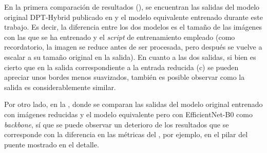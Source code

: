 %
%
%
%    





En la primera comparación de resultados (), se encuentran las salidas del modelo original DPT-Hybrid publicado en \cite{visiontransformersDPT} y el modelo equivalente entrenado durante este trabajo. Es decir, la diferencia entre los dos modelos es el tamaño de las imágenes con las que se ha entrenado y el \textit{script} de entrenamiento empleado (como recordatorio, la imagen se reduce antes de ser procesada, pero después se vuelve a escalar a su tamaño original en la salida). En cuanto a las dos salidas, si bien es cierto que en la salida correspondiente a la entrada reducida (c) se pueden apreciar unos bordes menos suavizados, también es posible observar como la salida es considerablemente similar.

Por otro lado, en la , donde se comparan las salidas del modelo original entrenado con imágenes reducidas y el modelo equivalente pero con EfficientNet-B0 como \textit{backbone}, sí que se puede observar un deterioro de los resultados que se corresponde con la diferencia en las métricas del , por ejemplo, en el pilar del puente mostrado en el detalle.

\pagebreak

